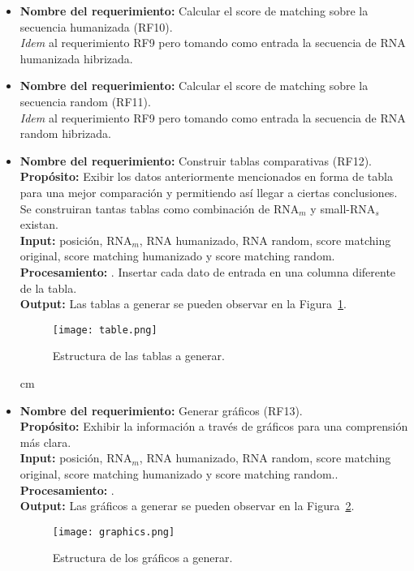 \documentclass[12pt,a4paper,spanish]{article}
\begin{document}
\begin{itemize}
		\item \textbf{Nombre del requerimiento:} Calcular el score de matching sobre la secuencia humanizada (RF10).\\
		\textit{Idem} al requerimiento RF9 pero tomando como entrada la secuencia de RNA humanizada hibrizada. \\
		
		\item \textbf{Nombre del requerimiento:} Calcular el score de matching sobre la secuencia random (RF11).\\
		\textit{Idem} al requerimiento RF9 pero tomando como entrada la secuencia de RNA random hibrizada. \\

		\item \textbf{Nombre del requerimiento:} Construir tablas comparativas (RF12).\\
 	    \textbf{Propósito:} Exibir los datos anteriormente mencionados en forma de tabla para una mejor comparación y permitiendo así llegar a 								ciertas conclusiones. Se construiran tantas tablas como combinación de RNA$_m$ y small-RNA$_s$ existan.\\
		\textbf{Input:} posición, RNA$_m$, RNA humanizado, RNA random, score matching original, score matching humanizado y score matching random.\\
		\textbf{Procesamiento:} . Insertar cada dato de entrada en una columna diferente de la tabla.\\
		\textbf{Output:} Las tablas a generar se pueden observar en la Figura~\ref{table}.
			\vskip 0.5cm
			\begin{figure}[h]
				\begin{center}
					\texttt{[image: table.png]}
					\caption{Estructura de las tablas a generar.}
					\label{table}
				\end{center}
			\end{figure}
		
		 cm
		\item \textbf{Nombre del requerimiento:} Generar gráficos (RF13).\\
 	    \textbf{Propósito:} Exhibir la información a través de gráficos para una comprensión más clara.\\
		\textbf{Input:} posición, RNA$_m$, RNA humanizado, RNA random, score matching original, score matching humanizado y score matching random..\\
		\textbf{Procesamiento:} .\\
		\textbf{Output:} Las gráficos a generar se pueden observar en la Figura~\ref{graphic}.
			\begin{figure}[h]
				\begin{center}
					\texttt{[image: graphics.png]}
					\caption{Estructura de los gráficos a generar.}
					\label{graphic}
				\end{center}
			\end{figure}


\end{itemize}
\end{document}
